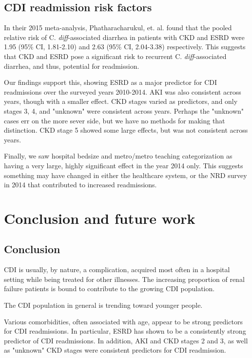 \documentclass[12pt]{ociamthesis}\usepackage[]{graphicx}\usepackage[]{color}
\newcommand{\cdiff}{C. \textit{diff}}
\newcommand{\ci}[3]{#1 (95\% CI, #2-#3)}
\begin{document}
\section{CDI readmission risk factors}

In their 2015 meta-analysis, Phatharacharukul, et. al. \cite{Phatharacharukul2015} found that the pooled relative risk of \cdiff-associated diarrhea
in patients with CKD and ESRD were \ci{1.95}{1.81}{2.10} and \ci{2.63}{2.04}{3.38} respectively. 
This suggests that CKD and ESRD pose a significant risk to recurrent \cdiff-associated diarrhea, and thus, potential for readmission.

Our findings support this, showing ESRD as a major predictor for CDI readmissions over the surveyed years 2010-2014. 
AKI was also consistent across years, though with a smaller effect.
CKD stages varied as predictors, and only stages 3, 4, and "unknown" were consistent across years. Perhaps the "unknown" cases
err on the more sever side, but we have no methods for making that distinction. 
CKD stage 5 showed some large effects, but was not consistent across years. 

Finally, we saw hospital bedsize and metro/metro teaching categorization as having a very large, highly significant effect
in the year 2014 only. This suggests something may have changed in either the healthcare system, or the NRD survey in 2014 that contributed to 
increased readmissions. 

\chapter{Conclusion and future work}


\section{Conclusion}

CDI is usually, by nature, a complication, acquired most often in a hospital
setting while being treated for other illnesses. The increasing proportion of 
renal failure patients is bound to contribute to the growing CDI population.

The CDI population in general is trending toward younger people. 

Various comorbidities, often associated with age, appear to be strong predictors
for CDI readmissions. In particular, ESRD has shown to be a consistently strong
predictor of CDI readmissions. In addition, AKI and CKD stages 2 and 3, as well as "unknown" CKD
stages were consistent predictors for CDI readmission. 
\end{document}

